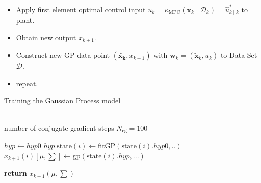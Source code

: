 \begin{algorithm}
\begin{algorithmic}[1]
\begin{itemize}
            \item Apply first element optimal control input \(u_k=\kappa_{\mathrm{MPC}}\left(\boldsymbol{x}_k \mid \mathcal{D}_k\right)=\hat{u}_{k \mid k}^*\) to plant.
            \item Obtain new output \(x_{k+1}\).
            \item Construct new GP data point \(\left(\boldsymbol{\tilde{x_k}}, x_{k+1}\right) \) with \(\boldsymbol{w}_k=\left(\boldsymbol{\tilde{x}}_k, u_k\right)\) to Data Set \(\mathcal{D}\).
            \item repeat.
        \end{itemize}
    \end{algorithmic}
\end{algorithm}



\begin{algorithm}
\caption{Training the Gaussian Process model}
\label{alg:gp_model}
\renewcommand{\algorithmicrequire}{\textbf{Input:}}
\renewcommand{\algorithmicensure}{\textbf{Output:}}
    \begin{algorithmic}
     \\
            \quad number of conjugate gradient steps $N_{\text{cg}} = 100$
    \end{algorithmic}

    \begin{algorithmic}[1]
            \State $hyp \gets hyp0$
        \Else
            \State $hyp.\text{state}(i) \gets \text{fitGP}(\text{state}(i).hyp0,..)$ \quad {}
        \EndIf
        \State $x_{k+1}(i)[\mu,\sum] \gets \text{gp}(\text{state}(i).hyp,...)$ 
        
    \EndFor
    
    \State \textbf{return} $x_{k+1}(\mu,\sum)$

\end{algorithmic}
\end{algorithm}






